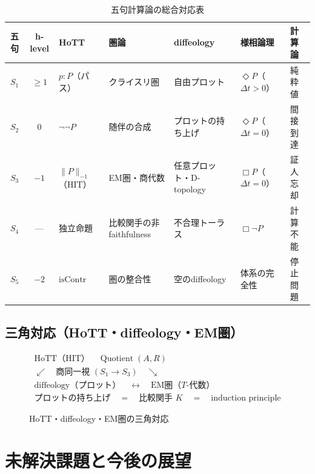 \documentclass[11pt,a4paper]{ltjsarticle}
\theoremstyle{remark}
\newcommand{\isContr}{\mathrm{isContr}}
\begin{document}
\begin{table}[htbp]
\centering
\caption{五句計算論の総合対応表}
\label{tab:integrated}
\scriptsize
\setlength{\tabcolsep}{3pt}
\begin{tabularx}{\textwidth}{@{}c c >{\raggedright\arraybackslash}X >{\raggedright\arraybackslash}X >{\raggedright\arraybackslash}X >{\raggedright\arraybackslash}X >{\raggedright\arraybackslash}X@{}}
\toprule
五句 & h-level & HoTT & 圏論 & diffeology & 様相論理 & 計算論 \\
\midrule
$S_1$ & $\geq1$ & $p:P$（パス） & クライスリ圏 & 自由プロット & $\Diamond P$（$\Delta t>0$） & 純粋値 \\
$S_2$ & $0$ & $\neg\neg P$ & 随伴の合成 & プロットの持ち上げ & $\Diamond P$（$\Delta t=0$） & 間接到達 \\
$S_3$ & $-1$ & $\lVert P\rVert_{-1}$（HIT） & EM圏・商代数 & 任意プロット・D-topology & $\Box P$（$\Delta t=0$） & 証人忘却 \\
$S_4$ & --- & 独立命題 & 比較関手の非faithfulness & 不合理トーラス & $\Box\neg P$ & 計算不能 \\
$S_5$ & $-2$ & $\isContr$ & 圏の整合性 & 空のdiffeology & 体系の完全性 & 停止問題 \\
\bottomrule
\end{tabularx}
\end{table}

\subsection{三角対応（HoTT・diffeology・EM圏）}

\begin{figure}[htbp]
\centering
\[
\begin{array}{c}
\text{HoTT（HIT）}\quad \operatorname{Quotient}(A,R)\\[4pt]
\swarrow\quad\text{商同一視 }(S_1\to S_3)\quad\searrow\\[4pt]
\text{diffeology（プロット）}\quad\longleftrightarrow\quad
\text{EM圏（$T$-代数）}\\[4pt]
\text{プロットの持ち上げ}\quad=\quad
\text{比較関手 $K$}\quad=\quad\text{induction principle}
\end{array}
\]
\caption{HoTT・diffeology・EM圏の三角対応}
\label{fig:triangle}
\end{figure}

\section{未解決課題と今後の展望}
\end{document}
